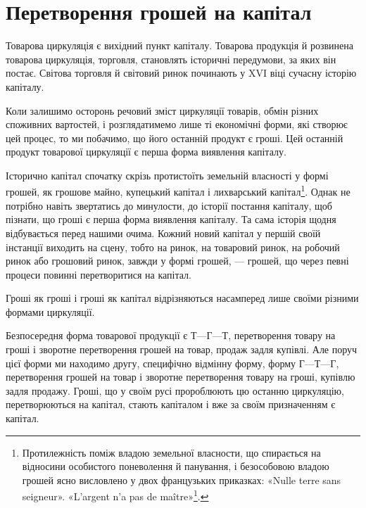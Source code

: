 
\chapter{Перетворення грошей на капітал}

Товарова циркуляція є вихідний пункт капіталу. Товарова
продукція й розвинена товарова циркуляція, торговля, становлять
історичні передумови, за яких він постає. Світова торговля
й світовий ринок починають у XVI віці сучасну історію
капіталу.

Коли залишимо осторонь речовий зміст циркуляції товарів,
обмін різних споживних вартостей, і розглядатимемо лише ті
економічні форми, які створює цей процес, то ми побачимо,
що його останній продукт є гроші. Цей останній продукт товарової
циркуляції є перша форма виявлення капіталу.

Історично капітал спочатку скрізь протистоїть земельній
власності у формі грошей, як грошове майно, купецький капітал
і лихварський капітал\footnote{
Протилежність поміж владою земельної власности, що спирається
на відносини особистого поневолення й панування, і безособовою владою
грошей ясно висловлено у двох французьких приказках: «Nulle terre
sans seigneur». «L’argent n’a pas de maître»\footnote*{
«Нема землі без господаря». «Гроші не мають господаря». \emph{Ред.}
}.
}. Однак не потрібно навіть звертатись до
минулости, до історії постання капіталу, щоб пізнати, що гроші
є перша форма виявлення капіталу. Та сама історія щодня відбувається
перед нашими очима. Кожний новий капітал у першій
своїй інстанції виходить на сцену, тобто на ринок, на товаровий
ринок, на робочий ринок або грошовий ринок, завжди у формі
грошей, — грошей, що через певні процеси повинні перетворитися
на капітал.

Гроші як гроші і гроші як капітал відрізняються насамперед
лише своїми різними формами циркуляції.

Безпосередня форма товарової продукції є $Т — Г — Т$, перетворення
товару на гроші і зворотне перетворення грошей на
товар, продаж задля купівлі. Але поруч цієї форми ми находимо
другу, специфічно відмінну форму, форму $Г — Т — Г$, перетворення
грошей на товар і зворотне перетворення товару на гроші,
купівлю задля продажу. Гроші, що у своїм русі пророблюють
цю останню циркуляцію, перетворюються на капітал, стають
капіталом і вже за своїм призначенням є капітал.

